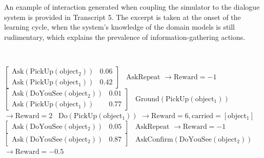 An example of interaction generated when coupling the simulator to the dialogue system is provided in Transcript 5. The excerpt is taken at the onset of the learning cycle, when the system's knowledge of the domain models is still rudimentary, which explains the prevalence of information-gathering actions. 

\begin{Transcript}[p!] 
\vspace{3mm}
\begin{normalsize}
$\phantom{a}$\hspace{13mm}
\begin{dialogue} 
 $\begin{bmatrix}\mathrm{Ask(PickUp(object_2))} & 0.06 \\
\mathrm{Ask(PickUp(object_1))}  & 0.42 \end{bmatrix}$ \vspace{3mm}
 \ $\mathrm{AskRepeat}$ \hspace{47mm} $\rightarrow \mathrm{Reward} = -1$ \vspace{3mm}
 $\begin{bmatrix}\mathrm{Ask(DoYouSee(object_2))}  & 0.01 \\ 
\mathrm{Ask(PickUp(object_1))} & 0.77 \end{bmatrix}$ \vspace{3mm}
 \ $\mathrm{Ground(PickUp(object_1))}$ \hspace{21mm} $\rightarrow \mathrm{Reward} = 2$ \vspace{3mm}
 \ $\mathrm{Do(PickUp(object_1))}$ \hspace{29mm} $\rightarrow \mathrm{Reward} = 6, \mathrm{carried} = [\mathrm{object_1}]$ \vspace{3mm}
 $\begin{bmatrix}\mathrm{Ask(DoYouSee(object_2))} & 0.05 \end{bmatrix}$ \vspace{3mm}
 \ $\mathrm{AskRepeat}$ \hspace{47mm} $\rightarrow \mathrm{Reward} = -1$ \vspace{3mm}
 $\begin{bmatrix} \mathrm{Ask(DoYouSee(object_2))}  & 0.87 \end{bmatrix}$ \vspace{3mm}
 \ $\mathrm{AskConfirm(DoYouSee(object_2))}$ \hspace{7mm} $\rightarrow \mathrm{Reward} = -0.5$ \vspace{3mm}

\end{dialogue}
\end{normalsize}
\end{Transcript}
